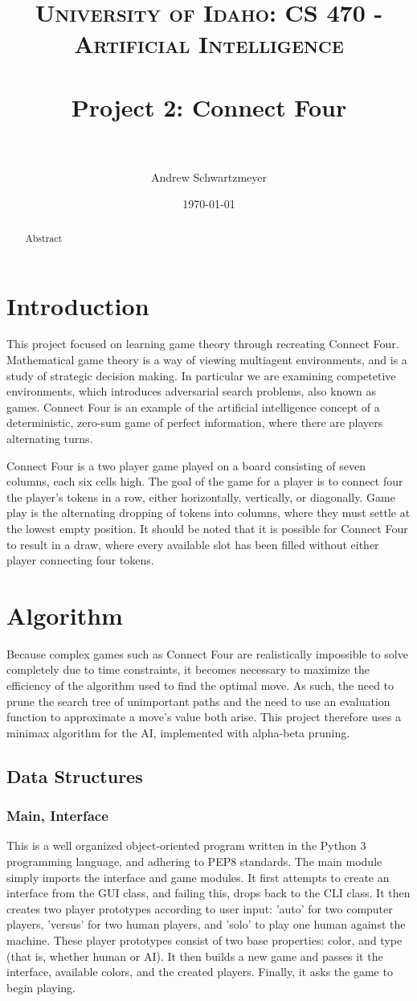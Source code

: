 \documentclass[12pt, article]{scrartcl}
\title{	
\normalfont \normalsize 
\textsc{University of Idaho: CS 470 - Artificial Intelligence} \\ [25pt]
\horrule{0.5pt} \\[0.4cm]
\huge Project 2: Connect Four\\
\horrule{2pt} \\[0.5cm]
}
\author{Andrew Schwartzmeyer}
\date{\normalsize\today}
\begin{document}
\maketitle 
\begin{abstract}
Abstract
\end{abstract}
\pagebreak
\section{Introduction}
This project focused on learning game theory through recreating Connect Four. Mathematical game theory is a way of viewing multiagent environments, and is a study of strategic decision making. In particular we are examining competetive environments, which introduces adversarial search problems, also known as games. Connect Four is an example of the artificial intelligence concept of a deterministic, zero-sum game of perfect information, where there are players alternating turns.

Connect Four is a two player game played on a board consisting of seven columns, each six cells high. The goal of the game for a player is to connect four the player's tokens in a row, either horizontally, vertically, or diagonally. Game play is the alternating dropping of tokens into columns, where they must settle at the lowest empty position. It should be noted that it is possible for Connect Four to result in a draw, where every available slot has been filled without either player connecting four tokens.

\section{Algorithm}
Because complex games such as Connect Four are realistically impossible to solve completely due to time constraints, it becomes necessary to maximize the efficiency of the algorithm used to find the optimal move. As such, the need to prune the search tree of unimportant paths and the need to use an evaluation function to approximate a move's value both arise. This project therefore uses a minimax algorithm for the AI, implemented with alpha-beta pruning.

\subsection{Data Structures}
\subsubsection{Main, Interface}
This is a well organized object-oriented program written in the Python 3 programming language, and adhering to PEP8 standards. The main module simply imports the interface and game modules. It first attempts to create an interface from the GUI class, and failing this, drops back to the CLI class. It then creates two player prototypes according to user input: 'auto' for two computer players, 'versus' for two human players, and 'solo' to play one human against the machine. These player prototypes consist of two base properties: color, and type (that is, whether human or AI). It then builds a new game and passes it the interface, available colors, and the created players. Finally, it asks the game to begin playing.
\end{document}
